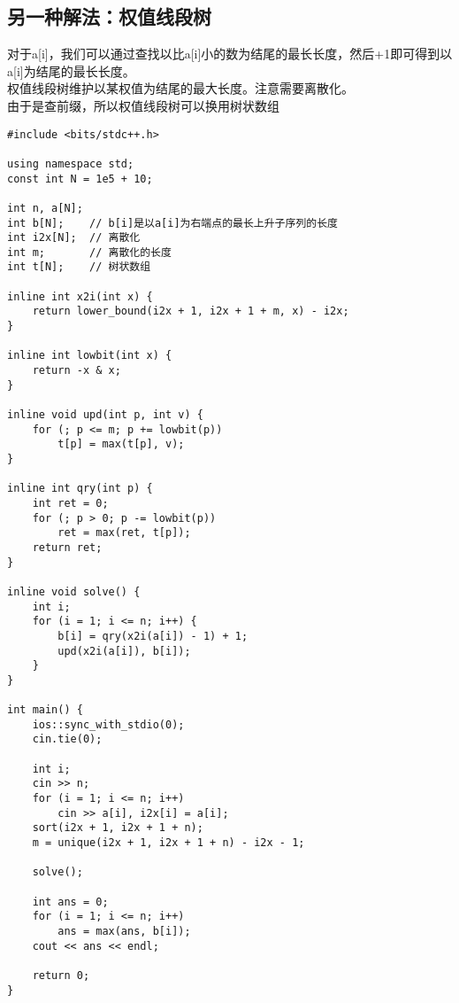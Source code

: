     \subsection{另一种解法：权值线段树}
        对于a[i]，我们可以通过查找以比a[i]小的数为结尾的最长长度，然后+1即可得到以a[i]为结尾的最长长度。\\
        权值线段树维护以某权值为结尾的最大长度。注意需要离散化。\\
        由于是查前缀，所以权值线段树可以换用树状数组
\begin{lstlisting}
#include <bits/stdc++.h>

using namespace std;
const int N = 1e5 + 10;

int n, a[N];
int b[N];    // b[i]是以a[i]为右端点的最长上升子序列的长度
int i2x[N];  // 离散化
int m;       // 离散化的长度
int t[N];    // 树状数组

inline int x2i(int x) {
    return lower_bound(i2x + 1, i2x + 1 + m, x) - i2x;
}

inline int lowbit(int x) {
    return -x & x;
}

inline void upd(int p, int v) {
    for (; p <= m; p += lowbit(p))
        t[p] = max(t[p], v);
}

inline int qry(int p) {
    int ret = 0;
    for (; p > 0; p -= lowbit(p))
        ret = max(ret, t[p]);
    return ret;
}

inline void solve() {
    int i;
    for (i = 1; i <= n; i++) {
        b[i] = qry(x2i(a[i]) - 1) + 1;
        upd(x2i(a[i]), b[i]);
    }
}

int main() {
    ios::sync_with_stdio(0);
    cin.tie(0);

    int i;
    cin >> n;
    for (i = 1; i <= n; i++)
        cin >> a[i], i2x[i] = a[i];
    sort(i2x + 1, i2x + 1 + n);
    m = unique(i2x + 1, i2x + 1 + n) - i2x - 1;

    solve();

    int ans = 0;
    for (i = 1; i <= n; i++)
        ans = max(ans, b[i]);
    cout << ans << endl;

    return 0;
}
\end{lstlisting}

